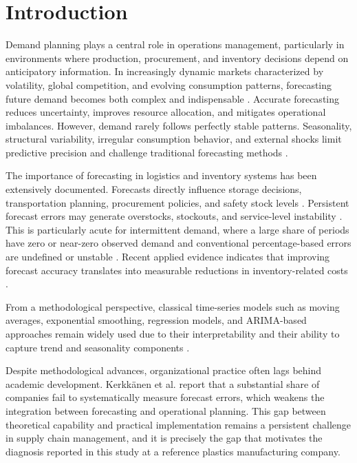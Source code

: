 \documentclass[forecasting,article,submit,pdftex,moreauthors]{Definitions/mdpi}
\begin{document}
\section{Introduction}

Demand planning plays a central role in operations management, particularly in environments where production, procurement, and inventory decisions depend on anticipatory information. In increasingly dynamic markets characterized by volatility, global competition, and evolving consumption patterns, forecasting future demand becomes both complex and indispensable \cite{mentzer2001,chopra2021}. Accurate forecasting reduces uncertainty, improves resource allocation, and mitigates operational imbalances. However, demand rarely follows perfectly stable patterns. Seasonality, structural variability, irregular consumption behavior, and external shocks limit predictive precision and challenge traditional forecasting methods \cite{makridakis1998,hyndman2021}.

The importance of forecasting in logistics and inventory systems has been extensively documented. Forecasts directly influence storage decisions, transportation planning, procurement policies, and safety stock levels \cite{ballou2004}. Persistent forecast errors may generate overstocks, stockouts, and service-level instability \cite{silver1998}. This is particularly acute for intermittent demand, where a large share of periods have zero or near-zero observed demand and conventional percentage-based errors are undefined or unstable \cite{syntetos2005}. Recent applied evidence indicates that improving forecast accuracy translates into measurable reductions in inventory-related costs \cite{sattar2025}.

From a methodological perspective, classical time-series models such as moving averages, exponential smoothing, regression models, and ARIMA-based approaches remain widely used due to their interpretability and their ability to capture trend and seasonality components \cite{makridakis1998,nahmias2015,hyndman2021}.

Despite methodological advances, organizational practice often lags behind academic development. Kerkk\"{a}nen et al. \cite{kerkkanen2009} report that a substantial share of companies fail to systematically measure forecast errors, which weakens the integration between forecasting and operational planning. This gap between theoretical capability and practical implementation remains a persistent challenge in supply chain management, and it is precisely the gap that motivates the diagnosis reported in this study at a reference plastics manufacturing company.
\end{document}
